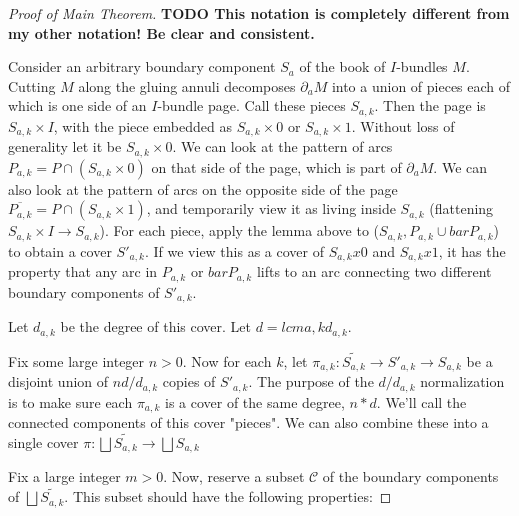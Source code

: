 \documentclass[12pt]{amsart}
\theoremstyle{definition}
\theoremstyle{remark}
\newcommand{\bd}{\partial}
\newcommand{\cC}{\mathcal{C}}
\begin{document}
\begin{proof}[Proof of Main Theorem]


\textbf{ TODO This notation is completely different from my other notation! Be
clear and consistent.}

Consider an arbitrary boundary component $S_a$ of the book of $I$-bundles $M$.
Cutting $M$ along the gluing annuli decomposes $\bd_aM$ into a union of pieces
each of which is one side of an $I$-bundle page. Call these pieces $S_{a,k}$.
Then the page is $S_{a,k}\times I$, with the piece embedded as $S_{a,k}\times
0$ or $S_{a,k}\times 1$. Without loss of generality let it be $S_{a,k}\times
0$. We can look at the pattern of arcs $P_{a,k} = P \cap (S_{a,k}\times 0)$ on
that side of the page, which is part of $\bd_aM$. We can also look at the pattern
of arcs on the opposite side of the page $\overline{P_{a,k}} = P \cap
(S_{a,k}\times 1)$, and temporarily view it as living inside $S_{a,k}$
(flattening $S_{a,k}\times I \to S_{a,k}$).  For each piece, apply the lemma
above to ($S_{a,k},P_{a,k} \cup barP_{a,k}$) to obtain a cover $S'_{a,k}$. If we
view this as a cover of $S_{a,k}x0$ and $S_{a,k}x1$, it has the property that
any arc in $P_{a,k}$ or $barP_{a,k}$ lifts to an arc connecting two different
boundary components of $S'_{a,k}$.

Let $d_{a,k}$ be the degree of this cover. Let $d = lcm a,k d_{a,k}$.

Fix some large integer $n>0$. Now for each $k$, let $\pi_{a,k}
\colon \widetilde{S_{a,k}} \to S'_{a,k} \to S_{a,k}$ be a disjoint union of $nd/d_{a,k}$
copies of $S'_{a,k}$. The purpose of the $d/d_{a,k}$ normalization is to make sure
each $\pi_{a,k}$ is a cover of the same degree, $n*d$.  We'll call the connected
components of this cover "pieces". We can also combine these into a single
cover $\pi \colon \bigsqcup \widetilde{S_{a,k}} \to \bigsqcup S_{a,k}$

Fix a large integer $m>0$. Now, reserve a subset $\cC$ of the boundary
components of $\bigsqcup \widetilde{S_{a,k}}$.  This subset should have the following
properties:


\end{proof}
\end{document}
